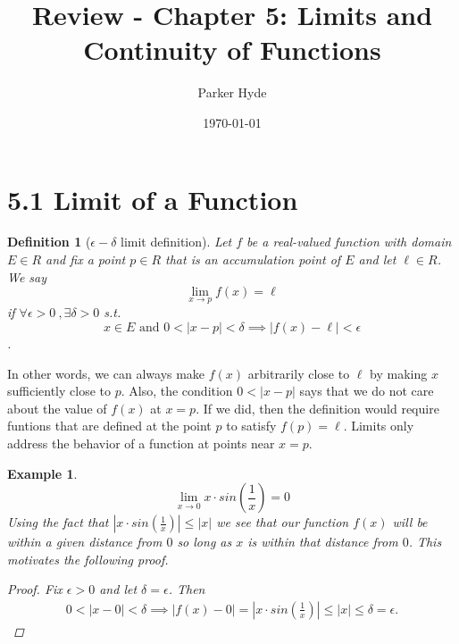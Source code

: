 \documentclass{article}
\begin{document}
\title{Review - Chapter 5: Limits and Continuity of Functions}
\author{Parker Hyde}
\date{\today}
\maketitle

\newtheorem{theorem}{Theorem}
\newtheorem{definition}{Definition}
\newtheorem{exmp}{Example}
\newtheorem{proposition}{Proposition}
\newtheorem{lemma}{Lemma}
\newtheorem{corollary}{Corollary}
\newtheorem{remark}{Remark}


\section*{5.1 Limit of a Function}

\begin{definition}[\( \epsilon - \delta \) limit definition]
    Let \( f \) be a real-valued function with domain \( E \in R \) and fix
    a point \( p \in R \) that is an accumulation point of \( E \) and let 
    \( \ell \in R \). We say
    \[
        \lim_{x \to p} f(x) = \ell
    \] 
    if \( \forall \epsilon > 0 \ , \exists \delta > 0\) s.t. 
    \[ x \in E \text{ and  } 0 < |x - p| < \delta \implies |f(x) - \ell| < \epsilon \].
\end{definition}

In other words, we can always make \( f(x) \) arbitrarily close to \( \ell \) by making
\( x \) sufficiently close to \( p \). Also, the condition \( 0 < |x - p| \) says
that we do not care about the value of \( f(x) \) 
at \( x = p \). If we did, then the definition would require funtions that are 
defined at the point \( p \) to satisfy \( f(p) = \ell \). Limits only address the
behavior of a function at points near \( x = p \).

\begin{exmp}
    \[
        \lim_{x \to 0} x  \cdot  sin \left(\frac{1}{x}\right) = 0
    \] 
    Using the fact that \( | x \cdot sin\left(\frac{1}{x}\right) | \le |x| \) we see that
    our function \( f(x) \) will be within a given distance from \( 0 \) so long as 
    \( x \) is within that distance from \( 0 \). This motivates the following proof.
    \begin{proof}
        Fix \( \epsilon > 0 \) and let \( \delta = \epsilon \). Then 
        \begin{align*}
            0 < |x - 0| < \delta \implies |f(x) - 0| = | x \cdot sin\left(\frac{1}{x}\right) | 
            \le |x| \le \delta = \epsilon.
        \end{align*}
    \end{proof}
\end{exmp}
\end{document}
